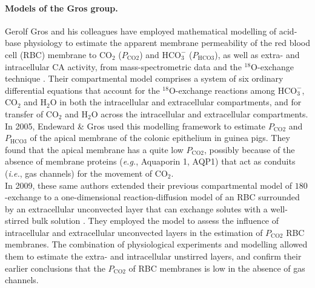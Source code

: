 \documentclass[fleqn,10pt]{physiome}
\begin{document}
\paragraph{Models of the Gros group.} Gerolf Gros and his colleagues have employed mathematical modelling of acid-base physiology to estimate the apparent membrane permeability of the red blood cell (RBC) membrane to $\mathrm{CO_2}$ ($P_\mathrm{CO2}$) and $\mathrm{HCO_3^-}$ ($P_\mathrm{HCO3}$), as well as extra- and intracellular CA activity, from mass-spectrometric data and the $^{18}$O-exchange technique \citep{wunder1997mathematical}. Their compartmental model comprises a system of six ordinary differential equations that account for the $^{18}$O-exchange reactions among $\mathrm{HCO_3^-}$, $\mathrm{CO_2}$ and $\mathrm{H_2O}$ in both the intracellular and extracellular compartments, and for transfer of $\mathrm{CO_2}$ and $\mathrm{H_2O}$ across the intracellular and extracellular compartments.\\

In 2005, Endeward \& Gros used this modelling framework to estimate $P_\mathrm{CO2}$ and $P_\mathrm{HCO3}$ of the apical membrane of the colonic epithelium in guinea pigs. They found that the apical membrane has a quite low $P_\mathrm{CO2}$, possibly because of the absence of membrane proteins (\emph{e.g.}, Aquaporin 1, AQP1) that act as conduits (\emph{i.e.}, gas channels) for the movement of $\mathrm{CO_2}$.\\

In 2009, these same authors extended their previous compartmental model of $180$-exchange to a one-dimensional reaction-diffusion model of an RBC surrounded by an extracellular unconvected layer that can exchange solutes with a well-stirred bulk solution \citep{endeward2009extra}. They employed the model to assess the influence of intracellular and extracellular unconvected layers in the estimation of $P_\mathrm{CO2}$ RBC membranes. The combination of physiological experiments and modelling allowed them to estimate the extra- and intracellular unstirred layers, and confirm their earlier conclusions that the $P_\mathrm{CO2}$ of RBC membranes is low in the absence of gas channels.\\
\end{document}
